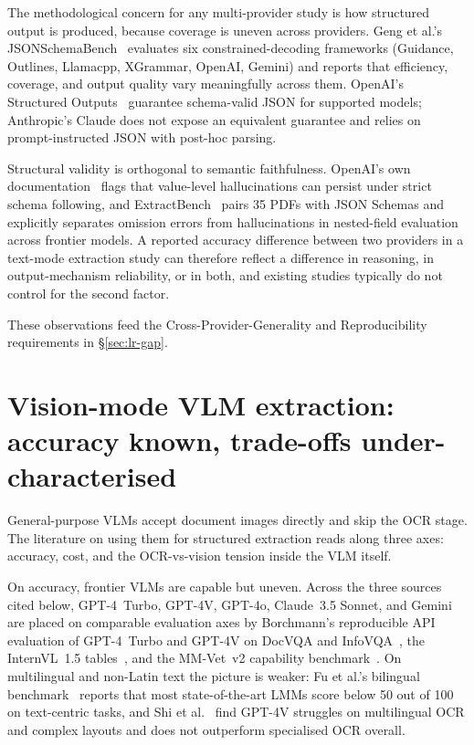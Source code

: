 The methodological concern for any multi-provider study is how
structured output is produced, because coverage is uneven across
providers. Geng et al.'s JSONSchemaBench~\cite{geng2025jsonbench}
evaluates six constrained-decoding frameworks (Guidance, Outlines,
Llamacpp, XGrammar, OpenAI, Gemini) and reports that efficiency,
coverage, and output quality vary meaningfully across them. OpenAI's
Structured Outputs~\cite{openai2024structured,openai-structuredoutputs-docs}
guarantee schema-valid JSON for supported models; Anthropic's Claude
does not expose an equivalent guarantee and relies on
prompt-instructed JSON with post-hoc parsing.

Structural validity is orthogonal to semantic faithfulness. OpenAI's
own documentation~\cite{openai-structuredoutputs-docs} flags that
value-level hallucinations can persist under strict schema following,
and ExtractBench~\cite{ferguson2026extractbench} pairs 35 PDFs with
JSON Schemas and explicitly separates omission errors from
hallucinations in nested-field evaluation across frontier models. A
reported accuracy difference between two providers in a text-mode
extraction study can therefore reflect a difference in reasoning, in
output-mechanism reliability, or in both, and existing studies
typically do not control for the second factor.

These observations feed the Cross-Provider-Generality and
Reproducibility requirements in \S\ref{sec:lr-gap}.

\section{Vision-mode VLM extraction: accuracy known, trade-offs under-characterised}
\label{sec:lr-visionmode}

General-purpose VLMs accept document images directly and skip the OCR
stage. The literature on using them for structured extraction reads
along three axes: accuracy, cost, and the OCR-vs-vision tension
inside the VLM itself.

On accuracy, frontier VLMs are capable but uneven. Across the three
sources cited below, GPT-4~Turbo, GPT-4V, GPT-4o, Claude~3.5 Sonnet,
and Gemini are placed on comparable evaluation axes by Borchmann's
reproducible API evaluation of GPT-4~Turbo and GPT-4V on DocVQA and
InfoVQA~\cite{borchmann2024gpt4}, the InternVL~1.5
tables~\cite{chen2024internvl}, and the MM-Vet~v2 capability
benchmark~\cite{yu2024mmvet2}.
On multilingual and non-Latin text the picture is weaker: Fu et
al.'s bilingual benchmark~\cite{fu2024bilingual} reports that most
state-of-the-art LMMs score below 50 out of 100 on text-centric
tasks, and Shi et al.~\cite{shi2023gpt4v} find GPT-4V struggles on
multilingual OCR and complex layouts and does not outperform
specialised OCR overall.

